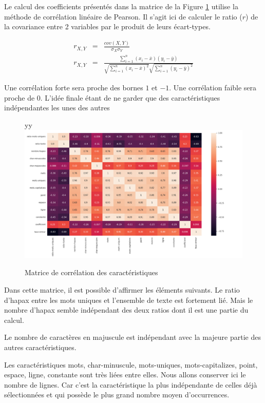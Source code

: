 			Le calcul des coefficients présentés dans la matrice de la Figure \ref{fig:corr} utilise la méthode de corrélation linéaire de Pearson.
			Il s'agit ici de calculer le ratio ($r$) de la covariance entre 2 variables par le produit de leurs écart-types.

			\begin{eqnarray*}
				r_{X,Y} &=& \frac{cov(X,Y)}{\sigma_{X}\sigma_{Y}}\\
				r_{X,Y} &=& \frac{\sum_{i=1}^{n}(x_{i}-\overline{x})(y_{i}-\overline{y})}{\sqrt{\sum_{i=1}^{n}(x_{i}-\overline{x})^{2}}\sqrt{\sum_{i=1}^{n}(y_{i}-\overline{y})^{2}}}
			\end{eqnarray*}

			Une corrélation forte sera proche des bornes $1$ et $-1$.
            Une corrélation faible sera proche de $0$.
            L'idée finale étant de ne garder que des caractéristiques indépendantes les unes des autres
            \begin{figure}[H]
yy				\includegraphics[width=\linewidth]{img/features_corr}
				\caption{Matrice de corrélation des caractéristiques}
				\label{fig:corr}
			\end{figure}

            Dans cette matrice, il est possible d'affirmer les éléments suivants.
            Le ratio d'hapax entre les mots uniques et l'ensemble de texte est fortement lié.
            Mais le nombre d'hapax semble indépendant des deux ratios dont il est une partie du calcul.

            Le nombre de caractères en majuscule est indépendant avec la majeure partie des autres caractéristiques.

            Les caractéristiques mots, char-minuscule, mots-uniques, mots-capitalizes, point, espace, ligne, constante sont très liées entre elles.
            Nous allons conserver ici le nombre de lignes.
            Car c'est la caractéristique la plus indépendante de celles déjà sélectionnées et qui possède le plus grand nombre moyen d'occurrences.

